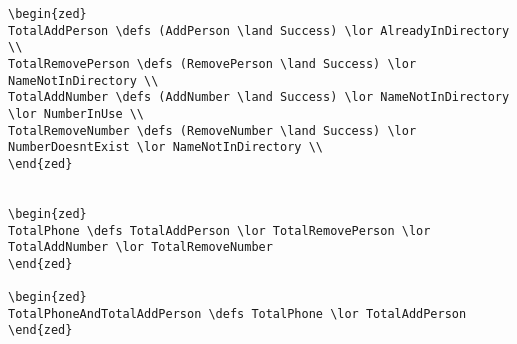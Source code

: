 \begin{verbatim}
\begin{zed}
TotalAddPerson \defs (AddPerson \land Success) \lor AlreadyInDirectory \\
TotalRemovePerson \defs (RemovePerson \land Success) \lor NameNotInDirectory \\
TotalAddNumber \defs (AddNumber \land Success) \lor NameNotInDirectory \lor NumberInUse \\
TotalRemoveNumber \defs (RemoveNumber \land Success) \lor NumberDoesntExist \lor NameNotInDirectory \\
\end{zed}


\begin{zed}
TotalPhone \defs TotalAddPerson \lor TotalRemovePerson \lor TotalAddNumber \lor TotalRemoveNumber
\end{zed}

\begin{zed}
TotalPhoneAndTotalAddPerson \defs TotalPhone \lor TotalAddPerson
\end{zed}


\end{verbatim}